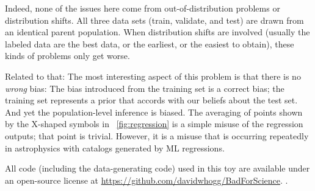 \documentclass[10pt]{article}
\newcommand{\figref}[1]{\figurename~\ref{#1}}
\begin{document}
Indeed, none of the issues here come from out-of-distribution problems or distribution shifts.
All three data sets (train, validate, and test) are drawn from an identical parent population.
When distribution shifts are involved (usually the labeled data are the best data, or the earliest, or the easiest to obtain), these kinds of problems only get worse.

Related to that: The most interesting aspect of this problem is that there is no \emph{wrong} bias:
The bias introduced from the training set is a correct bias; the training set represents a prior that accords with our beliefs about the test set.
And yet the population-level inference is biased.
The averaging of points shown by the X-shaped symbols in \figref{fig:regression} is a simple misuse of the regression outputs; that point is trivial.
However, it is a misuse that is occurring repeatedly in astrophysics with catalogs generated by ML regressions.

All code (including the data-generating code) used in this toy are available under an open-source license at 
\ifarxiv
\url{https://github.com/davidwhogg/BadForScience}.
.
\fi
\end{document}
